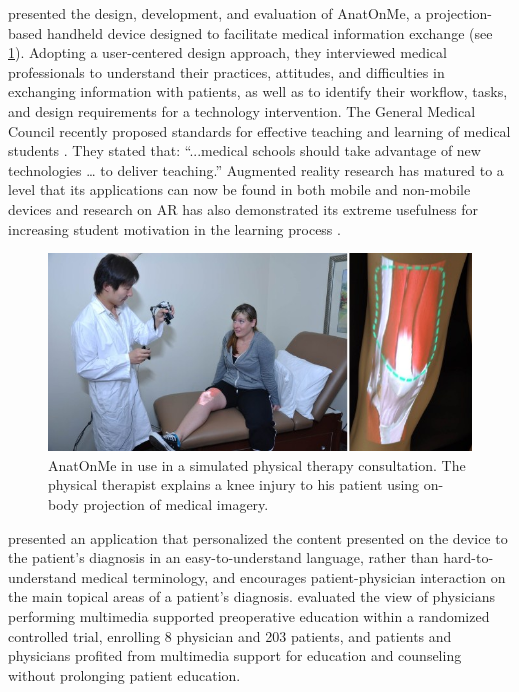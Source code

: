 \citet{Ni2011} presented the design, development, and evaluation of AnatOnMe, a projection-based handheld device designed to facilitate medical information exchange (see \figurename{ \ref{fig:2-bg:AnatOnMe-projection-basedhandhelddevice}}). Adopting a user-centered design approach, they interviewed medical professionals to understand their practices, attitudes, and difficulties in exchanging information with patients, as well as to identify their workflow, tasks, and design requirements for a technology intervention.
The General Medical Council recently proposed standards for effective teaching and learning of medical students \cite{Council2009}. They stated that: “...medical schools should take advantage of new technologies … to deliver teaching.” Augmented reality research has matured to a level that its applications can now be found in both mobile and non-mobile devices \cite{Bacca2014} and research on AR has also demonstrated its extreme usefulness for increasing student motivation in the learning process \cite{Chang2014,DiSerio2013}.
\begin{figure}
\centering
\includegraphics[width=0.7\linewidth]{"figures/2-bg/AnatOnMe-projection-based handheld device"}
\caption{AnatOnMe in use in a simulated physical therapy consultation. The physical therapist explains a knee injury to his patient using on-body projection of medical imagery.}
\label{fig:2-bg:AnatOnMe-projection-basedhandhelddevice}
\end{figure}

\citet{Gonzales2012} presented an application that personalized the content presented on the device to the patient's diagnosis in an easy-to-understand language, rather than hard-to-understand medical terminology, and encourages patient-physician interaction on the main topical areas of a patient's diagnosis.
\citet{Ihrig2012} evaluated the view of physicians performing multimedia supported preoperative education within a randomized controlled trial, enrolling 8 physician and 203 patients, and patients and physicians profited from multimedia support for education and counseling without prolonging patient education. 


